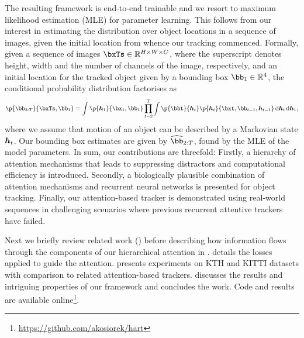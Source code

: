     The resulting framework is end-to-end trainable and we resort to maximum likelihood estimation (MLE) for parameter learning.
	This follows from our interest in estimating the distribution over object locations in a sequence of images, given the initial location from whence our tracking commenced. 
	Formally, given a sequence of images $\bxTs \in \RR^{H \times W \times C}$, where the superscript denotes height, width and the number of channels of the image, respectively, and an initial location for the tracked object given by a bounding box $\bb_1 \in \RR^4$, the conditional probability distribution factorises as
    \begin{equation}
        \p{\bb_{2:T}}{\bxTs, \bb_1} = \int \p{\B{h}_1}{\bx_1, \bb_1} \prod_{t=2}^T \int \p{\bbt}{\B{h}_t} \p{\B{h}_t}{\bxt, \bb_{t-1}, \B{h}_{t-1}} \dint \B{h}_t \dint \B{h}_1,
    \end{equation}
    where we assume that motion of an object can be described by a Markovian state $\B{h}_t$.
    Our bounding box estimates are given by $\widehat{\bb}_{2:T}$, found by the MLE of the model parameters. In sum, our contributions are threefold: 
    Firstly, a hierarchy of attention mechanisms that leads to suppressing distractors and computational efficiency is introduced.
    Secondly, a biologically plausible combination of attention mechanisms and recurrent neural networks is presented for object tracking.
    Finally, our attention-based tracker is demonstrated using real-world sequences in challenging scenarios where previous recurrent attentive trackers have failed.
    \iffalse
    \begin{itemize}
        \item a biologically plausible way of combining attention mechanisms with recurrent neural networks for object tracking,
        \item a hierarchy of attention mechanisms that leads to suppressing distractors and computational efficiency,
        \item the scaling of an attention-based tracker to real-world exceeding prior recurrent attentive tracking models. 
    \end{itemize}
    \fi
    Next we briefly review related work () before describing how information flows through the components of our hierarchical attention in .  details the losses applied to guide the attention.  presents experiments on KTH and KITTI datasets with comparison to related attention-based trackers.  discusses the results and intriguing properties of our framework and  concludes the work. Code and results are available online\footnote{\url{https://github.com/akosiorek/hart}}.
        

	
	
	
	
	
	
	
	
	

	